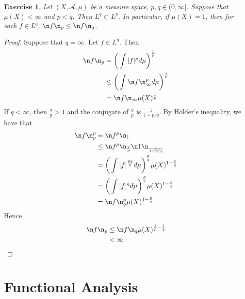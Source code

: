 \documentclass[12pt]{amsart}
\newtheorem{ex}[thm]{Exercise}
\newcommand{\MA}{\mathcal{A}}
\begin{document}
\begin{ex}
	Let $(X, \MA, \mu)$ be a measure space, $p,q \in (0, \infty]$. Suppose that $\mu(X) < \infty$ and $p < q$. Then $L^q \subset L^p$. In particular, if $\mu(X) = 1$, then for each $f \in L^q$, $\n f\n_p \leq \n f\n_q$.
\end{ex}

\begin{proof}
	Suppose that $q = \infty$. Let $f \in L^q$. Then
	\begin{align*}
		\n f \n_p 
		&= \bigg(\int \vert f \vert^p d \mu \bigg)^{\frac{1}{p}} \\
		& \leq \bigg(\int \n  f \n_{\infty} ^p d \mu \bigg)^{\frac{1}{p}} \\
		&= \n f \n_{\infty} \mu(X)^{\frac{1}{p}}
	\end{align*} 
	If $q < \infty$, then $\frac{q}{p} > 1$ and the conjugate of $\frac{q}{p}$ is $\frac{1}{1- p/q}$. By Hölder's inequality, we have that 
	\begin{align*}
		\n f \n_p^p 
		&= \n f^p \n_1 \\
		&\leq \n f^p \n_{\frac{q}{p}} \n 1 \n_{\frac{1}{1-p/q}} \\
		&= \bigg(\int |f|^{\frac{pq}{p}} d \mu \bigg)^{\frac{p}{q}} \mu(X)^{1-\frac{p}{q}} \\
		&= \bigg(\int |f|^{q} d \mu \bigg)^{\frac{p}{q}}\mu(X)^{1-\frac{p}{q}} \\
		&= \n f \n_q^p\mu(X)^{1-\frac{p}{q}}
	\end{align*}
	Hence 
	\begin{align*}
		\n f \n_p 
		&\leq \n f \n_q\mu(X)^{\frac{1}{p}-\frac{1}{q}} \\
		&< \infty
	\end{align*}
\end{proof}






























\section{Functional Analysis}
\end{document}

